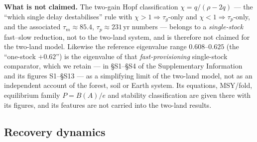 \documentclass[11pt]{article}
\begin{document}
\noindent\textbf{What is not claimed.} The two-gain Hopf classification $\chi=q/(\rho-2q)$ --- the ``which
single delay destabilises'' rule with $\chi>1\Rightarrow\tau_g$-only and $\chi<1\Rightarrow\tau_p$-only, and the
associated $\tau_m\approx85.4$, $\tau_p\approx231$\,yr numbers --- belongs to a \emph{single-stock} fast--slow
reduction, not to the two-land system, and is therefore not claimed for the two-land model. Likewise the
reference eigenvalue range $0.608$--$0.625$ (the ``one-stock $+0.62$'') is the eigenvalue of that
\emph{fast-provisioning} single-stock comparator, which we retain --- in \S S1--\S S4 of the Supplementary
Information and its figures S1--\S S13 --- as a simplifying limit of the two-land model, not as an
independent account of the forest, soil or Earth system. Its equations, MSY/fold, equilibrium family $P=B(A)/e$ and stability classification are given there with its figures, and its features are not carried into the two-land results.

\subsection{Recovery dynamics}
\end{document}
